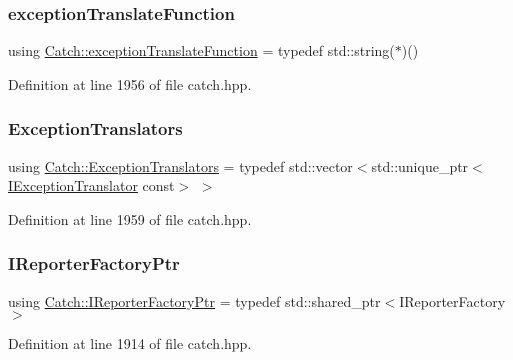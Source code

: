 \subsubsection{\texorpdfstring{exception\+Translate\+Function}{exceptionTranslateFunction}}
{\footnotesize\ttfamily using \mbox{\hyperlink{namespace_catch_ae8d8673884dc36b98875106322a2a37b}{Catch\+::exception\+Translate\+Function}} = typedef std\+::string($\ast$)()}



Definition at line 1956 of file catch.\+hpp.

\mbox{\label{namespace_catch_a7ad07967e688fdc03cf784f58be4b741}} 
\subsubsection{\texorpdfstring{Exception\+Translators}{ExceptionTranslators}}
{\footnotesize\ttfamily using \mbox{\hyperlink{namespace_catch_a7ad07967e688fdc03cf784f58be4b741}{Catch\+::\+Exception\+Translators}} = typedef std\+::vector$<$std\+::unique\+\_\+ptr$<$\mbox{\hyperlink{struct_catch_1_1_i_exception_translator}{I\+Exception\+Translator}} const$>$ $>$}



Definition at line 1959 of file catch.\+hpp.

\mbox{\label{namespace_catch_ad1b36ac40c2739e52fd453dcdddf0d09}} 
\subsubsection{\texorpdfstring{I\+Reporter\+Factory\+Ptr}{IReporterFactoryPtr}}
{\footnotesize\ttfamily using \mbox{\hyperlink{namespace_catch_ad1b36ac40c2739e52fd453dcdddf0d09}{Catch\+::\+I\+Reporter\+Factory\+Ptr}} = typedef std\+::shared\+\_\+ptr$<$I\+Reporter\+Factory$>$}



Definition at line 1914 of file catch.\+hpp.

\mbox{\label{namespace_catch_afa04ebe8e9423240c9585f7101a82ddf}} 
